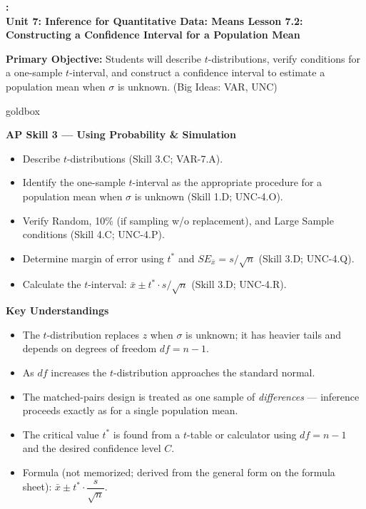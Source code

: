 \documentclass[10pt]{article}
\newcommand{\UnitNumberName}{Unit 7: Inference for Quantitative Data: Means \quad}
\newcommand{\LessonNumberName}{Lesson 7.2: Constructing a Confidence Interval for a Population Mean}
\begin{document}
\begin{center}
    {\Large\bfseries \CourseName: \SchoolYear \\
    {\small\bfseries \UnitNumberName \LessonNumberName}}
\end{center}

\begin{tcolorbox}[colback=sky, colframe=navy, boxrule=0.9pt, arc=2mm,
    left=2mm, right=2mm, top=1.5mm, bottom=1.5mm]
    \textbf{Primary Objective:} Students will describe $t$-distributions, verify conditions
    for a one-sample $t$-interval, and construct a confidence interval to estimate a
    population mean when $\sigma$ is unknown. (Big Ideas: VAR, UNC)
\end{tcolorbox}

\renewcommand{\arraystretch}{1.6}
\begin{skillbox}{goldbox}
\begin{minipage}[t]{0.48\linewidth}
    \textbf{AP Skill 3 --- Using Probability \& Simulation}
    \begin{itemize}
        \item Describe $t$-distributions (Skill 3.C; VAR-7.A).
        \item Identify the one-sample $t$-interval as the appropriate procedure for a
              population mean when $\sigma$ is unknown (Skill 1.D; UNC-4.O).
        \item Verify Random, 10\% (if sampling w/o replacement), and Large Sample
              conditions (Skill 4.C; UNC-4.P).
        \item Determine margin of error using $t^*$ and $SE_{\bar x} = s/\sqrt{n}$
              (Skill 3.D; UNC-4.Q).
        \item Calculate the $t$-interval: $\bar x \pm t^* \cdot s/\sqrt{n}$
              (Skill 3.D; UNC-4.R).
    \end{itemize}
\end{minipage}
\hfill
\begin{minipage}[t]{0.48\linewidth}
    \textbf{Key Understandings}
    \begin{itemize}
        \item The $t$-distribution replaces $z$ when $\sigma$ is unknown; it has
              heavier tails and depends on degrees of freedom $df = n - 1$.
        \item As $df$ increases the $t$-distribution approaches the standard normal.
        \item The matched-pairs design is treated as one sample of \emph{differences}
              --- inference proceeds exactly as for a single population mean.
        \item The critical value $t^*$ is found from a $t$-table or calculator using
              $df = n - 1$ and the desired confidence level $C$.
        \item Formula (not memorized; derived from the general form on the formula
              sheet): $\bar x \pm t^* \cdot \dfrac{s}{\sqrt{n}}$.
    \end{itemize}
\end{minipage}
\end{skillbox}
\end{document}

